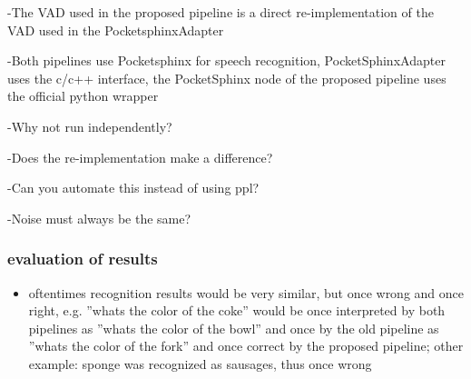 -The VAD used in the proposed pipeline is a direct re-implementation of the VAD used in the PocketsphinxAdapter

-Both pipelines use Pocketsphinx for speech recognition, PocketSphinxAdapter uses the c/c++ interface, the PocketSphinx node of the proposed pipeline uses the official python wrapper

-Why not run independently? 

-Does the re-implementation make a difference?

-Can you automate this instead of using ppl?

-Noise must always be the same?


\subsubsection{evaluation of results}


\begin{itemize}
	\item oftentimes recognition results would be very similar, but once wrong and once right, e.g. ''whats the color of the coke'' would be once interpreted by both pipelines as ''whats the color of the bowl'' and once by the old pipeline as ''whats the color of the fork'' and once correct by the proposed pipeline; other example: sponge was recognized as sausages, thus once wrong
\end{itemize}

